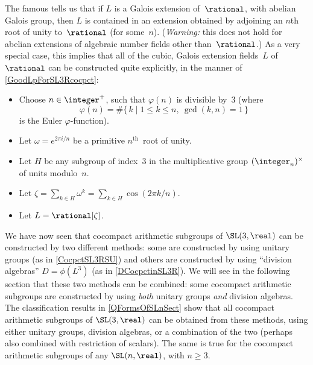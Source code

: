\begin{rem} \label{AbelExtsAreCyclotomic}
 The famous  tells us that if $L$ is a Galois extension of~$\rational$, with abelian Galois group, then $L$ is contained in an extension obtained by adjoining an $n$th root of unity to~$\rational$ (for some~$n$). (\emph{Warning:} this does not hold for abelian extensions of algebraic number fields other than~$\rational$.) As a very special case, this implies that all of the cubic, Galois extension fields~$L$ of~$\rational$ can be
constructed quite explicitly, in the manner of \cref{GoodLpForSL3Rcocpct}:
 \begin{itemize}
 \item Choose $n \in \integer^+$, such that $\varphi(n)$ is
divisible by~$3$ (where 
 $$\varphi(n) = \# \{\, k \mid 1 \le k \le n, \ \gcd(k,n) =
1 \,\} $$
 is the Euler $\varphi$-function).
 \item Let $\omega = e^{2\pi i/n}$ be a primitive
$n^\text{th}$~root of unity.
 \item Let $H$ be any subgroup of index~$3$ in the
multiplicative group $(\integer_n)^\times$ of units
modulo~$n$.
 \item Let $\zeta = \sum_{k \in H} \omega^k = \sum_{k \in
H} \cos(2 \pi k/n)$.
 \item Let $L = \rational[\zeta]$.
 \end{itemize}
 \end{rem}

We have now seen that cocompact arithmetic subgroups of $\SL(3,\real)$ can be constructed
by two different methods: some are constructed by using unitary groups (as in \cref{CocpctSL3RSU}) and others are constructed by using ``division 
algebras'' $D = \phi(L^3)$ (as in \cref{DCocpctinSL3R}). We will see in the following %
section that these two methods can be
combined: some cocompact arithmetic subgroups are constructed by using \emph{both}
unitary groups \emph{and} division algebras. The classification results in
\cref{QFormsOfSLnSect} show that all
cocompact arithmetic subgroups of $\SL(3,\real)$ can be obtained from these methods, using either unitary groups, division algebras, or 
a combination of the two (perhaps also combined with restriction of scalars). The same is true for the cocompact arithmetic subgroups of any $\SL(n,\real)$, with $n \ge 3$.


